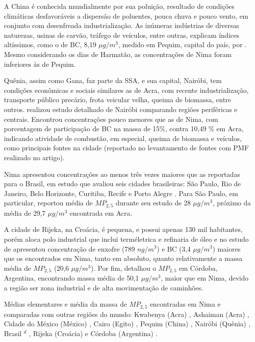 A China é conhecida mundialmente por sua poluição, resultado de condições
climáticas desfavoráveis a dispersão de poluentes, pouca chuva e pouco vento, 
em conjunto com desenfreada industrialização. As inúmeras indústrias
de diversas naturezas, usinas de carvão, tráfego de veículos, entre outras, 
explicam índices altíssimos, como o de BC, 8,19 $\mu g/m^3$, 
medido em Pequim, capital do país, por \citet{yang2011}. Mesmo considerando 
os dias de Harmatão, as concentrações de Nima foram inferiores às de Pequim.

Quênia, assim como Gana, faz parte da SSA, e sua capital, Nairóbi, tem condições
econômicas e sociais similares as de Acra, com recente industrialização, 
transporte público precário, frota veicular velha, queima de biomassa, 
entre outros.  
\citet{gaita2014} realizou estudo detalhado de Nairóbi comparando regiões 
periféricas e centrais. Encontrou concentrações pouco menores que as de Nima, 
com porcentagem de participação de BC na massa de 15\%, contra 10,49 \% em Acra,
indicando atividade de combustão, em especial, queima de biomassa e veículos, 
como principais fontes na cidade 
(reportado no levantamento de fontes com PMF realizado no artigo). 

Nima apresentou concentrações ao menos três vezes maiores que as reportadas 
para o Brasil, em estudo que avaliou seis cidades brasileiras: São Paulo, 
Rio de Janeiro, Belo Horizonte, Curitiba, Recife e Porto Alegre
\citep{andrade2012urban}. Para São Paulo, em particular, \citet{andrade2012}
reportou média de $MP_{2,5}$ durante seu estudo de 28 $\mu g / m^3$, 
próximo da média de 29,7 $\mu g / m^3$ encontrada em Acra. 

A cidade de Rijeka, na Croácia, é pequena, e possui apenas 130 mil habitantes, 
porém aloca polo industrial que inclui terméletrica e refinaria de óleo
e no estudo de \citet{ivovsevic2015} apresentou concentração de enxofre
(789 $ng / m^3$) e BC (3,4 $\mu g / m^3$) maiores que os encontrados em Nima, 
tanto em absoluto, quanto relativamente a massa média de $MP_{2,5}$ 
(20,6 $\mu g / m^3$). 
Por fim, \citet{achad2014} detalhou o $MP_{2,5}$ em Córdoba, Argentina, 
encontrando massa média de 50,1 $\mu g / m^3$, maior que em Nima, devido a 
região ser zona industrial e de alta movimentação de caminhões.   

\begin{landscape}
  \begin{table}[H]
    \centering
    
    \caption{Médias elementares e média da massa de $MP_{2,5}$ encontradas
             em Nima e comparadas com outras regiões do mundo:
             Kwabenya (Acra) \citep{aboh2009},
             Ashaiman (Acra) \citep{ofosu2012},
             Cidade do México (México) \citep{diaz2014},
             Cairo (Egito) \citep{boman2013},
             Pequim (China) \citep{yang2011},
             Nairóbi (Quênia)  \citep{gaita2014},
             Brasil $^d$ \citep{andrade2012urban},
             Rijeka (Croácia) \citep{ivovsevic2015} e
             Córdoba (Argentina) \citep{achad2014}.
             \label{table:fino_in_the_world}}
  \end{table} 
\end{landscape}

